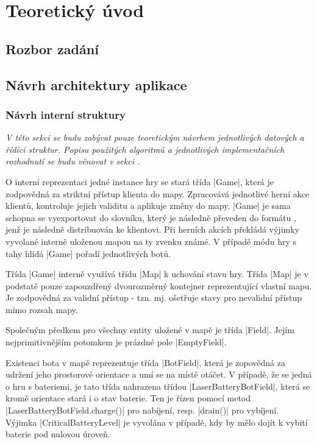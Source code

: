 
\section{Teoretický úvod}

\subsection{Rozbor zadání}
\subsection{Návrh architektury aplikace}

\subsubsection{Návrh interní struktury}

\textit{
	V této sekci se budu zabývat pouze teoretickým návrhem jednotlivých datových a řídící struktur. Popisu použitých algoritmů a jednotlivých implementačních rozhodnutí se budu věnovat v sekci .
}

O interní reprezentaci jedné instance hry se stará třída \ic|Game|, která je zodpovědná za striktní přístup klienta do mapy. Zpracovává jednotlivé herní akce klientů, kontroluje jejich validitu a aplikuje změny do mapy. \ic|Game| je sama schopna se vyexportovat do slovníku, který je následně převeden do formátu , jenž je následně distribuován ke klientovi. Při herních akcích překládá výjimky vyvolané interně uloženou mapou na ty zvenku známé. V případě módu hry s tahy hlídá \ic|Game| pořadí jednotlivých botů.

Třída \ic|Game| interně využívá třídu \ic|Map| k uchování stavu hry. Třída \ic|Map| je v podstatě pouze zapouzdřený dvourozměrný kontejner reprezentující vlastní mapu. Je zodpovědná za validní přístup - tzn. mj. ošetřuje stavy pro nevalidní přístup mimo rozsah mapy.

Společným předkem pro všechny entity uložené v mapě je třída \ic|Field|. Jejím nejprimitivnějším potomkem je prázdné pole \ic|EmptyField|.

\begin{sloppypar}
	Existenci bota v mapě reprezentuje třída \ic|BotField|, která je zopovědná za udržení jeho prostorové orientace a umí se na místě otáčet. V případě, že se jedná o hru s bateriemi, je tato třída nahrazena třídou \ic|LaserBatteryBotField|, která se kromě orientace stará i o stav baterie. Ten je řízen pomocí metod \ic|LaserBatteryBotField.charge()| pro nabíjení, resp. \ic|drain()| pro vybíjení. Výjimka \ic|CriticalBatteryLevel| je vyvolána v případě, kdy by mělo dojít k vybití baterie pod nulovou úrove\v{n}.
\end{sloppypar}

